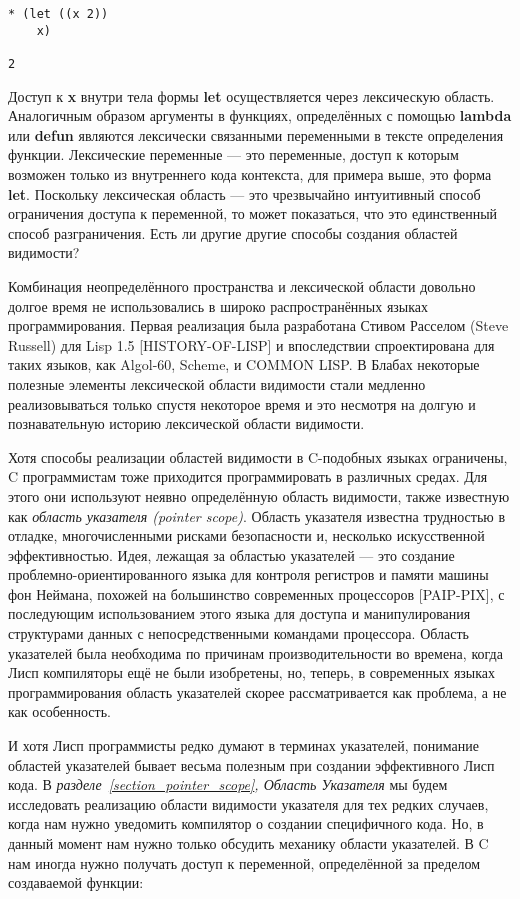\begin{verbatim}
* (let ((x 2))
    x)

2
\end{verbatim}

Доступ к \textbf{x} внутри тела формы \textbf{let} осуществляется через лексическую область. Аналогичным образом аргументы в функциях, определённых с помощью \textbf{lambda} или \textbf{defun} являются лексически связанными переменными в тексте определения функции. Лексические переменные --- это переменные, доступ к которым возможен только из внутреннего кода контекста, для примера выше, это форма \textbf{let}. Поскольку лексическая область --- это чрезвычайно интуитивный способ ограничения доступа к переменной, то может показаться, что это единственный способ разграничения. Есть ли другие другие способы создания областей видимости?

Комбинация неопределённого пространства и лексической области довольно долгое время не использовались в широко распространённых языках программирования. Первая реализация была разработана Стивом Расселом (Steve Russell) для Lisp 1.5 [HISTORY-OF-LISP] и впоследствии спроектирована для таких языков, как Algol-60, Scheme, и COMMON LISP. В Блабах некоторые полезные элементы лексической области видимости стали медленно реализовываться только спустя некоторое время и это несмотря на долгую и познавательную историю лексической области видимости.

Хотя способы реализации областей видимости в C-подобных языках ограничены, C программистам тоже приходится программировать в различных средах. Для этого они используют неявно определённую область видимости, также известную как \emph{область указателя (pointer scope)}. Область указателя известна трудностью в отладке, многочисленными рисками безопасности и, несколько искусственной эффективностью. Идея, лежащая за областью указателей --- это создание проблемно-ориентированного языка для контроля регистров и памяти машины фон Неймана, похожей на большинство современных процессоров [PAIP-PIX], с последующим использованием этого языка для доступа и манипулирования структурами данных с непосредственными командами процессора. Область указателей была необходима по причинам производительности во времена, когда Лисп компиляторы ещё не были изобретены, но, теперь, в современных языках программирования область указателей скорее рассматривается как проблема, а не как особенность.

И хотя Лисп программисты редко думают в терминах указателей, понимание областей указателей бывает весьма полезным при создании эффективного Лисп кода. В \emph{разделе~\ref{section_pointer_scope}, Область Указателя} мы будем исследовать реализацию области видимости указателя для тех редких случаев, когда нам нужно уведомить компилятор о создании специфичного кода. Но, в данный момент нам нужно только обсудить механику области указателей. В C нам иногда нужно получать доступ к переменной, определённой за пределом создаваемой функции:

